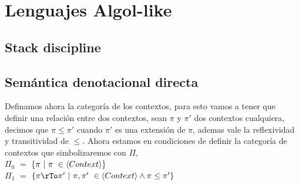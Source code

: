 \chapter{Lenguajes Algol-like}
\label{chap:algollike}

\section{Stack discipline}

\section{Sem\'antica denotacional directa}
Definamos ahora la categor\'ia de los contextos, para esto vamos a tener que definir una relaci\'on
entre dos contextos, sean $\pi$ y $\pi'$ dos contextos cualquiera, decimos que $\pi \leq \pi'$ cuando
$\pi'$ es una extensi\'on de $\pi$, ademas vale la reflexividad y transitividad de $\leq$. Ahora
estamos en condiciones de definir la categor\'ia de contextos que simbolizaremos con $\Pi$,\\

\noindent $\Pi_0$ $=$ $\{\pi \ | \ \pi \ \in \langle Context \rangle \}$\\
$\Pi_1$ $=$ $\{\pi \rTo \pi' \ | \ \pi,\pi' \ \in \lrangles{Context} \wedge \pi \leq \pi' \}$\\
